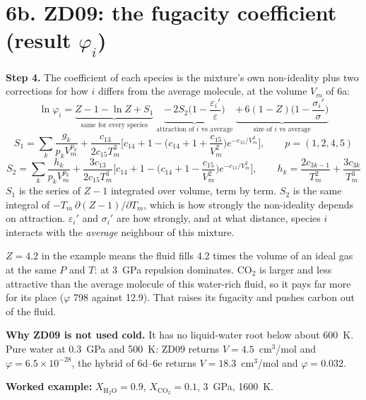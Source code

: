 \documentclass[11pt]{article}
\begin{document}
\clearpage
\section*{6b. ZD09: the fugacity coefficient \quad (result $\varphi_i$)}
{\small\setlength{\abovedisplayskip}{2pt}\setlength{\belowdisplayskip}{2pt}
\begin{minipage}[t]{0.60\linewidth}
\textbf{Step 4.} The coefficient of each species is the mixture's own non-ideality plus two corrections for how $i$ differs from the average molecule, at the volume $V_m$ of 6a:
\begin{equation}
  \ln\varphi_i=\underbrace{Z-1-\ln Z+S_1}_{\text{same for every species}}
  \;\underbrace{-\,2S_2\Big(1-\frac{\varepsilon_i'}{\varepsilon}\Big)}_{\text{attraction of }i\text{ vs average}}
  \;\underbrace{+\,6(1-Z)\Big(1-\frac{\sigma_i'}{\sigma}\Big)}_{\text{size of }i\text{ vs average}}
\end{equation}
\begin{equation}
  S_1=\sum_{k}\frac{g_k}{p_kV_m^{p_k}}+\frac{c_{13}}{2c_{15}T_m^3}\Big[c_{14}+1-\Big(c_{14}+1+\frac{c_{15}}{V_m^2}\Big)e^{-c_{15}/V_m^2}\Big],\qquad  p=(1,2,4,5)
\end{equation}
\begin{equation}
  S_2=\sum_{k}\frac{h_k}{p_kV_m^{p_k}}+\frac{3c_{13}}{2c_{15}T_m^3}\Big[c_{14}+1-\Big(c_{14}+1-\frac{c_{15}}{V_m^2}\Big)e^{-c_{15}/V_m^2}\Big],\qquad h_k=\frac{2c_{3k-1}}{T_m^2}+\frac{3c_{3k}}{T_m^3}
\end{equation}
$S_1$ is the series of $Z-1$ integrated over volume, term by term. $S_2$ is the same integral of $-T_m\,\partial(Z-1)/\partial T_m$, which is how strongly the non-ideality depends on attraction. $\varepsilon_i'$ and $\sigma_i'$ are how strongly, and at what distance, species $i$ interacts with the \emph{average} neighbour of this mixture.

\medskip
$Z=4.2$ in the example means the fluid fills 4.2 times the volume of an ideal gas at the same $P$ and $T$: at 3~GPa repulsion dominates. CO$_2$ is larger and less attractive than the average molecule of this water-rich fluid, so it pays far more for its place ($\varphi$ 798 against 12.9). That raises its fugacity and pushes carbon out of the fluid.

\medskip
\textbf{Why ZD09 is not used cold.} It has no liquid-water root below about 600~K. Pure water at 0.3~GPa and 500~K: ZD09 returns $V=4.5$~cm$^3$/mol and $\varphi=6.5\times10^{-28}$, the hybrid of 6d--6e returns $V=18.3$~cm$^3$/mol and $\varphi=0.032$.
\end{minipage}\hfill
\begin{minipage}[t]{0.37\linewidth}
\textbf{Worked example:} $X_{\mathrm{H_2O}}=0.9$, $X_{\mathrm{CO_2}}=0.1$, 3~GPa, 1600~K.


\end{minipage}}
\end{document}
